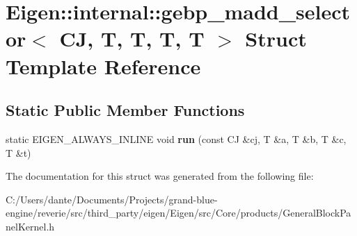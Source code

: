 \hypertarget{struct_eigen_1_1internal_1_1gebp__madd__selector_3_01_c_j_00_01_t_00_01_t_00_01_t_00_01_t_01_4}{}\section{Eigen\+::internal\+::gebp\+\_\+madd\+\_\+selector$<$ CJ, T, T, T, T $>$ Struct Template Reference}
\label{struct_eigen_1_1internal_1_1gebp__madd__selector_3_01_c_j_00_01_t_00_01_t_00_01_t_00_01_t_01_4}
\subsection*{Static Public Member Functions}
\begin{DoxyCompactItemize}
\item 
\mbox{\label{struct_eigen_1_1internal_1_1gebp__madd__selector_3_01_c_j_00_01_t_00_01_t_00_01_t_00_01_t_01_4_a9c7067aeacff0a1010ede59f4cd74f49}} 
static E\+I\+G\+E\+N\+\_\+\+A\+L\+W\+A\+Y\+S\+\_\+\+I\+N\+L\+I\+NE void {\bfseries run} (const CJ \&cj, T \&a, T \&b, T \&c, T \&t)
\end{DoxyCompactItemize}


The documentation for this struct was generated from the following file\+:\begin{DoxyCompactItemize}
\item 
C\+:/\+Users/dante/\+Documents/\+Projects/grand-\/blue-\/engine/reverie/src/third\+\_\+party/eigen/\+Eigen/src/\+Core/products/General\+Block\+Panel\+Kernel.\+h\end{DoxyCompactItemize}
